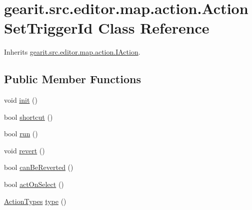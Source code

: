\hypertarget{classgearit_1_1src_1_1editor_1_1map_1_1action_1_1_action_set_trigger_id}{\section{gearit.\+src.\+editor.\+map.\+action.\+Action\+Set\+Trigger\+Id Class Reference}
\label{classgearit_1_1src_1_1editor_1_1map_1_1action_1_1_action_set_trigger_id}
}


Inherits \hyperlink{interfacegearit_1_1src_1_1editor_1_1map_1_1action_1_1_i_action}{gearit.\+src.\+editor.\+map.\+action.\+I\+Action}.

\subsection*{Public Member Functions}
\begin{DoxyCompactItemize}
\item 
void \hyperlink{classgearit_1_1src_1_1editor_1_1map_1_1action_1_1_action_set_trigger_id_a7e0120eb65ffd50d57855a9bef49220a}{init} ()
\item 
bool \hyperlink{classgearit_1_1src_1_1editor_1_1map_1_1action_1_1_action_set_trigger_id_a759f75c539e9c70ce99b156b42038caf}{shortcut} ()
\item 
bool \hyperlink{classgearit_1_1src_1_1editor_1_1map_1_1action_1_1_action_set_trigger_id_a0206936961e92fa1769f5343dce1e56b}{run} ()
\item 
void \hyperlink{classgearit_1_1src_1_1editor_1_1map_1_1action_1_1_action_set_trigger_id_a34030f5462466e4be7123238758a975d}{revert} ()
\item 
bool \hyperlink{classgearit_1_1src_1_1editor_1_1map_1_1action_1_1_action_set_trigger_id_a020de3384ba681157fb518504be9ca96}{can\+Be\+Reverted} ()
\item 
bool \hyperlink{classgearit_1_1src_1_1editor_1_1map_1_1action_1_1_action_set_trigger_id_a81fddd391f1e1eb68cf73636a5935ccd}{act\+On\+Select} ()
\item 
\hyperlink{namespacegearit_1_1src_1_1editor_1_1map_1_1action_af036712a7d960b13d1e31954e65c00e3}{Action\+Types} \hyperlink{classgearit_1_1src_1_1editor_1_1map_1_1action_1_1_action_set_trigger_id_a6995e3fd983550dbd58fd5c0523c1b50}{type} ()
\end{DoxyCompactItemize}


